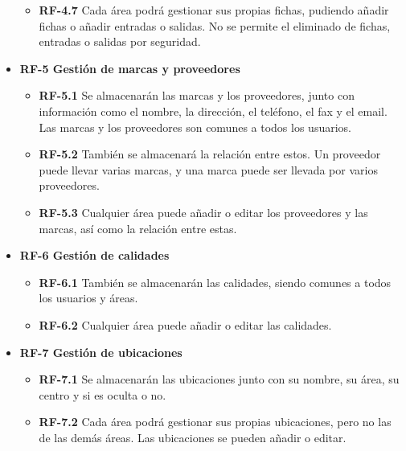 \begin{itemize}
\begin{itemize}
	\item\textbf{ RF-4.7} Cada área podrá gestionar sus propias fichas, pudiendo añadir fichas o añadir entradas o salidas. No se permite el eliminado de fichas, entradas o salidas por seguridad.
	\end{itemize} 
	
	\item \textbf{RF-5 Gestión de marcas y proveedores}
	\begin{itemize}
	\item\textbf{ RF-5.1} Se almacenarán las marcas y los proveedores, junto con información como el nombre, la dirección, el teléfono, el fax y el email. Las marcas y los proveedores son comunes a todos los usuarios.
	
	\item\textbf{ RF-5.2} También se almacenará la relación entre estos. Un proveedor puede llevar varias marcas, y una marca puede ser llevada por varios proveedores.
	
	\item\textbf{ RF-5.3} Cualquier área puede añadir o editar los proveedores y las marcas, así como la relación entre estas.
	\end{itemize}
	
	\item \textbf{RF-6 Gestión de calidades}
	\begin{itemize}
	\item\textbf{ RF-6.1} También se almacenarán las calidades, siendo comunes a todos los usuarios y áreas.
	
	\item\textbf{ RF-6.2} Cualquier área puede añadir o editar las calidades.
	
	\end{itemize}
	
	\item \textbf{RF-7 Gestión de ubicaciones}
	\begin{itemize}
	\item\textbf{ RF-7.1} Se almacenarán las ubicaciones junto con su nombre, su área, su centro y si es oculta o no.
	
	\item\textbf{ RF-7.2} Cada área podrá gestionar sus propias ubicaciones, pero no las de las demás áreas. Las ubicaciones se pueden añadir o editar.
	
	\end{itemize}
	
\end{itemize}


